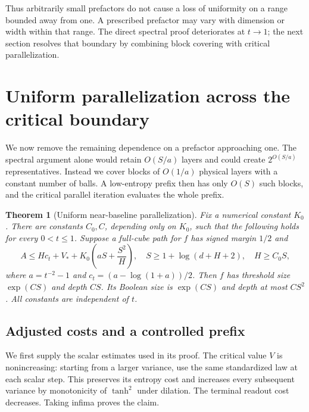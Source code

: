 \documentclass[11pt]{article}
\newtheorem{theorem}{Theorem}[section]
\theoremstyle{remark}
\begin{document}
Thus arbitrarily small prefactors do not cause a loss of uniformity
on a range bounded away from one. A prescribed prefactor may vary
with dimension or width within that range. The direct spectral
proof deteriorates at $t\to1$; the next section resolves that
boundary by combining block covering with critical parallelization.

\section{Uniform parallelization across the critical boundary}
\label{sec:uniform-prefactor}

We now remove the remaining dependence on a prefactor approaching
one. The spectral argument alone would retain $O(S/a)$ layers
and could create $2^{O(S/a)}$ representatives. Instead we cover
blocks of $O(1/a)$ physical layers with a constant number of
balls. A low-entropy prefix then has only $O(S)$ such blocks,
and the critical parallel iteration evaluates the whole prefix.

\begin{theorem}[Uniform near-baseline parallelization]
\label{thm:uniform-normal-form}
Fix a numerical constant $K_0$. There are constants $C_0,C$,
depending only on $K_0$, such that the following holds for
every $0<t\le1$. Suppose a full-cube path for $f$ has signed
margin $1/2$ and
\[
 A\le Hc_t+V_*+K_0\left(aS+\frac{S^2}{H}\right),
 \quad S\ge1+\log(d+H+2),\quad H\ge C_0S,
\]
where $a=t^{-2}-1$ and $c_t=(a-\log(1+a))/2$.
Then $f$ has threshold size $\exp(CS)$ and depth $CS$.
Its Boolean size is $\exp(CS)$ and depth at most $CS^2$.
All constants are independent of $t$.
\end{theorem}

\subsection{Adjusted costs and a controlled prefix}

We first supply the scalar estimates used in its proof. The
critical value $V$ is nonincreasing: starting from a larger
variance, use the same standardized law at each scalar step.
This preserves its entropy cost and increases every subsequent
variance by monotonicity of $\tanh^2$ under dilation. The
terminal readout cost decreases. Taking infima proves the claim.
\end{document}
